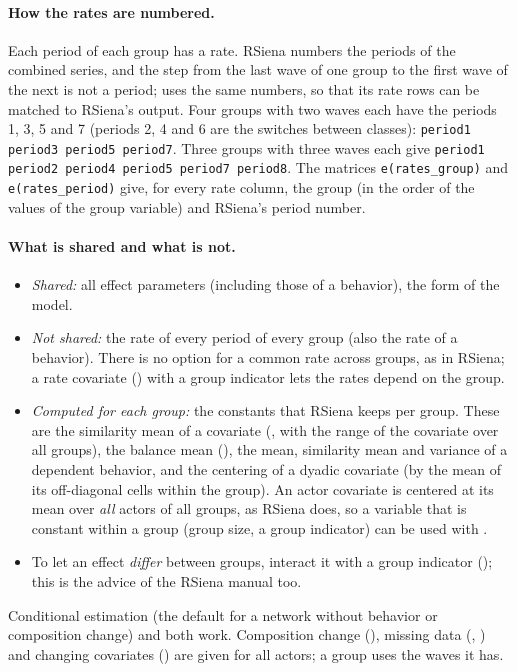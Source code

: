 \paragraph{How the rates are numbered.} Each period of each group has a rate. RSiena numbers the periods of the combined series, and the step from the last wave of one group to the first wave of the next is not a period; \nwsaom{} uses the same numbers, so that its rate rows can be matched to RSiena's output. Four groups with two waves each have the periods 1, 3, 5 and 7 (periods 2, 4 and 6 are the switches between classes): \texttt{period1 period3 period5 period7}. Three groups with three waves each give \texttt{period1 period2 period4 period5 period7 period8}. The matrices \texttt{e(rates\_group)} and \texttt{e(rates\_period)} give, for every rate column, the group (in the order of the values of the group variable) and RSiena's period number.

\paragraph{What is shared and what is not.}
\begin{itemize}[nosep]
  \item \emph{Shared:} all effect parameters (including those of a behavior), the form of the model.
  \item \emph{Not shared:} the rate of every period of every group (also the rate of a behavior). There is no option for a common rate across groups, as in RSiena; a rate covariate () with a group indicator lets the rates depend on the group.
  \item \emph{Computed for each group:} the constants that RSiena keeps per group. These are the similarity mean of a covariate (, with the range of the covariate over all groups), the balance mean (), the mean, similarity mean and variance of a dependent behavior, and the centering of a dyadic covariate (by the mean of its off-diagonal cells within the group). An actor covariate is centered at its mean over \emph{all} actors of all groups, as RSiena does, so a variable that is constant within a group (group size, a group indicator) can be used with .
  \item To let an effect \emph{differ} between groups, interact it with a group indicator (); this is the advice of the RSiena manual too.
\end{itemize}
Conditional estimation (the default for a network without behavior or composition change) and  both work. Composition change (), missing data (, ) and changing covariates () are given for all actors; a group uses the waves it has.

